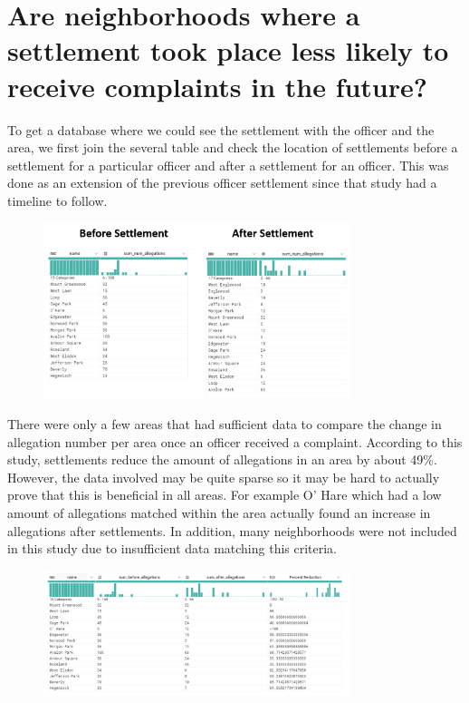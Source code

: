 \documentclass{article}
\begin{document}
\FloatBarrier


\section{Are neighborhoods where a settlement took place less likely to receive complaints in the future?}

To get a database where we could see the settlement with the officer and the area, we first join the several table and check the location of settlements before a settlement for a particular officer and after a settlement for an officer. This was done as an extension of the previous officer settlement since that study had a timeline to follow. 

\FloatBarrier

\begin{figure}[h!]
\centering
\includegraphics[width=0.8\textwidth]{district_allegation_counts.png}
\end{figure}

\FloatBarrier

There were only a few areas that had sufficient data to compare the change in allegation number per area once an officer received a complaint. According to this study, settlements reduce the amount of allegations in an area by about 49\%. However, the data involved may be quite sparse so it may be hard to actually prove that this is beneficial in all areas. For example O’ Hare which had a low amount of allegations matched within the area actually found an increase in allegations after settlements. In addition, many neighborhoods were not included in this study due to insufficient data matching this criteria. 

\begin{figure}[h!]
\centering
\includegraphics[width=0.8\textwidth]{district_statistics.png}
\end{figure}
\end{document}
